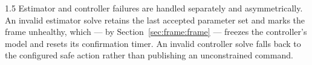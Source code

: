\begin{spacing}{1.5}
Estimator and controller failures are handled separately and asymmetrically. An
invalid estimator solve retains the last accepted parameter set and marks the
frame unhealthy, which --- by Section~\ref{sec:frame:frame} --- freezes the
controller's model and resets its confirmation timer. An invalid controller solve
falls back to the configured safe action rather than publishing an unconstrained
command.

\end{spacing}
\newpage

